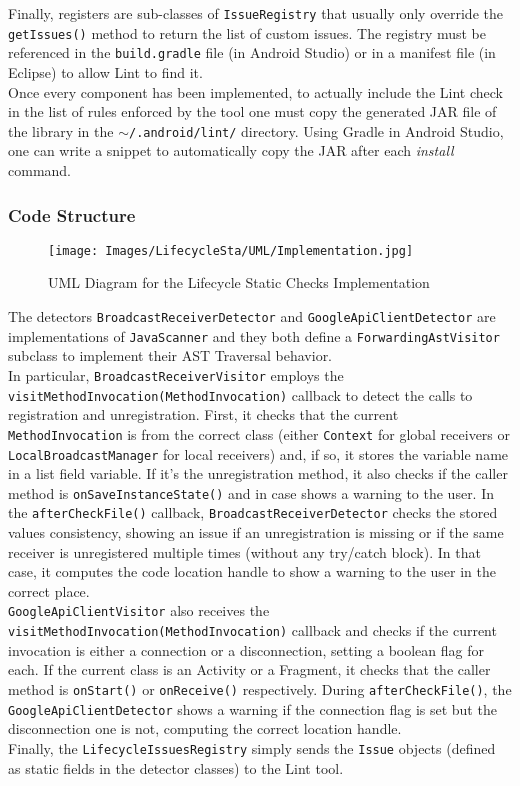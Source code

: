 \documentclass[11pt,a4paper,notitlepage]{article}
\begin{document}
Finally, registers are sub-classes of \texttt{IssueRegistry} that usually only override the \texttt{getIssues()} method to return the list of custom issues. The registry must be referenced in the \texttt{build.gradle} file (in Android Studio) or in a manifest file (in Eclipse) to allow Lint to find it.\bigskip \\
Once every component has been implemented, to actually include the Lint check in the list of rules enforced by the tool one must copy the generated JAR file of the library in the \texttt{$\sim$/.android/lint/} directory. Using Gradle in Android Studio, one can write a snippet to automatically copy the JAR after each \textit{install} command.

\subsubsection{Code Structure}
\begin{figure}
  \centering
  \texttt{[image: Images/LifecycleSta/UML/Implementation.jpg]}
  \caption[Lifecycle Static Checks Implementation UML]{UML Diagram for the Lifecycle Static Checks Implementation}
\end{figure}
The detectors \texttt{BroadcastReceiverDetector} and \texttt{GoogleApiClientDetector} are implementations of \texttt{JavaScanner} and they both define a \texttt{ForwardingAstVisitor} subclass to implement their AST Traversal behavior.\medskip \\
In particular, \texttt{BroadcastReceiverVisitor} employs the \texttt{visitMethodInvocation(MethodInvocation)} callback to detect the calls to registration and unregistration. First, it checks that the current \texttt{MethodInvocation} is from the correct class (either \texttt{Context} for global receivers or \texttt{LocalBroadcastManager} for local receivers) and, if so, it stores the variable name in a list field variable. If it's the unregistration method, it also checks if the caller method is \texttt{onSaveInstanceState()} and in case shows a warning to the user. In the \texttt{afterCheckFile()} callback,  \texttt{BroadcastReceiverDetector} checks the stored values consistency, showing an issue if an unregistration is missing or if the same receiver is unregistered multiple times (without any try/catch block). In that case, it computes the code location handle to show a warning to the user in the correct place.\medskip \\
\texttt{GoogleApiClientVisitor} also receives the \texttt{visitMethodInvocation(MethodInvocation)} callback and checks if the current invocation is either a connection or a disconnection, setting a boolean flag for each. If the current class is an Activity or a Fragment, it checks that the caller method is \texttt{onStart()} or \texttt{onReceive()} respectively. During \texttt{afterCheckFile()}, the \texttt{GoogleApiClientDetector} shows a warning if the connection flag is set but the disconnection one is not, computing the correct location handle.\bigskip \\
Finally, the \texttt{LifecycleIssuesRegistry} simply sends the \texttt{Issue} objects (defined as static fields in the detector classes) to the Lint tool.
\end{document}
